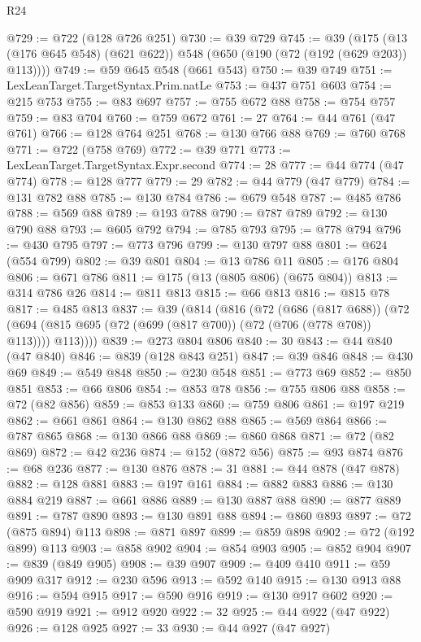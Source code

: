 \begin{lexlean}{R24}
\begin{coremodule}
@729 := @722 (@128 @726 @251)
@730 := @39 @729
@745 := @39
    (@175 (@13 (@176 @645 @548) (@621 @622)) @548 (@650 (@190 (@72 (@192 (@629 @203)) @113))))
@749 := @59 @645 @548 (@661 @543)
@750 := @39 @749
@751 := LexLeanTarget.TargetSyntax.Prim.natLe
@753 := @437 @751 @603
@754 := @215 @753
@755 := @83 @697
@757 := @755 @672 @88
@758 := @754 @757
@759 := @83 @704
@760 := @759 @672
@761 := 27
@764 := @44 @761 (@47 @761)
@766 := @128 @764 @251
@768 := @130 @766 @88
@769 := @760 @768
@771 := @722 (@758 @769)
@772 := @39 @771
@773 := LexLeanTarget.TargetSyntax.Expr.second
@774 := 28
@777 := @44 @774 (@47 @774)
@778 := @128 @777
@779 := 29
@782 := @44 @779 (@47 @779)
@784 := @131 @782 @88
@785 := @130 @784
@786 := @679 @548
@787 := @485 @786
@788 := @569 @88
@789 := @193 @788
@790 := @787 @789
@792 := @130 @790 @88
@793 := @605 @792
@794 := @785 @793
@795 := @778 @794
@796 := @430 @795
@797 := @773 @796
@799 := @130 @797 @88
@801 := @624 (@554 @799)
@802 := @39 @801
@804 := @13 @786 @11
@805 := @176 @804
@806 := @671 @786
@811 := @175 (@13 (@805 @806) (@675 @804))
@813 := @314 @786 @26
@814 := @811 @813
@815 := @66 @813
@816 := @815 @78
@817 := @485 @813
@837 := @39
    (@814
      (@816
        (@72
          (@686 (@817 @688))
          (@72 (@694 (@815 @695 (@72 (@699 (@817 @700)) (@72 (@706 (@778 @708)) @113)))) @113))))
@839 := @273 @804 @806
@840 := 30
@843 := @44 @840 (@47 @840)
@846 := @839 (@128 @843 @251)
@847 := @39 @846
@848 := @430 @69
@849 := @549 @848
@850 := @230 @548
@851 := @773 @69
@852 := @850 @851
@853 := @66 @806
@854 := @853 @78
@856 := @755 @806 @88
@858 := @72 (@82 @856)
@859 := @853 @133
@860 := @759 @806
@861 := @197 @219
@862 := @661 @861
@864 := @130 @862 @88
@865 := @569 @864
@866 := @787 @865
@868 := @130 @866 @88
@869 := @860 @868
@871 := @72 (@82 @869)
@872 := @42 @236
@874 := @152 (@872 @56)
@875 := @93 @874
@876 := @68 @236
@877 := @130 @876
@878 := 31
@881 := @44 @878 (@47 @878)
@882 := @128 @881
@883 := @197 @161
@884 := @882 @883
@886 := @130 @884 @219
@887 := @661 @886
@889 := @130 @887 @88
@890 := @877 @889
@891 := @787 @890
@893 := @130 @891 @88
@894 := @860 @893
@897 := @72 (@875 @894) @113
@898 := @871 @897
@899 := @859 @898
@902 := @72 (@192 @899) @113
@903 := @858 @902
@904 := @854 @903
@905 := @852 @904
@907 := @839 (@849 @905)
@908 := @39 @907
@909 := @409 @410
@911 := @59 @909 @317
@912 := @230 @596
@913 := @592 @140
@915 := @130 @913 @88
@916 := @594 @915
@917 := @590 @916
@919 := @130 @917 @602
@920 := @590 @919
@921 := @912 @920
@922 := 32
@925 := @44 @922 (@47 @922)
@926 := @128 @925
@927 := 33
@930 := @44 @927 (@47 @927)

\end{coremodule}
\end{lexlean}

